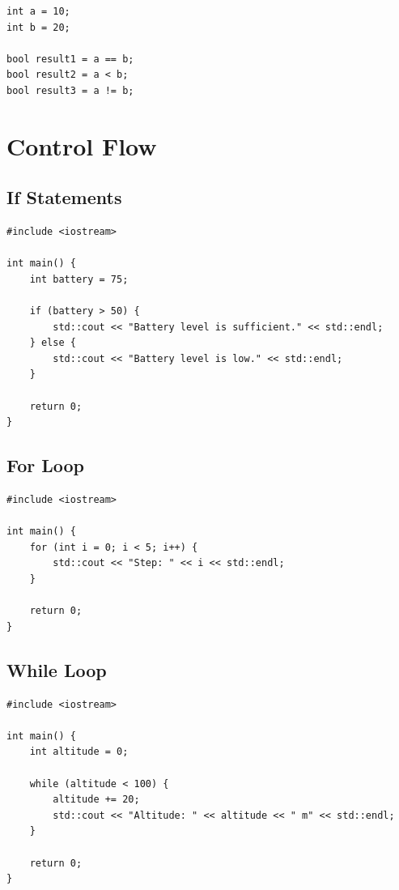 \documentclass[10pt]{report}
\begin{document}
\begin{lstlisting}[caption={Comparison Operators}]
int a = 10;
int b = 20;

bool result1 = a == b;
bool result2 = a < b;
bool result3 = a != b;
\end{lstlisting}

\section{Control Flow}

\subsection{If Statements}

\begin{lstlisting}[caption={If Statement}]
#include <iostream>

int main() {
    int battery = 75;

    if (battery > 50) {
        std::cout << "Battery level is sufficient." << std::endl;
    } else {
        std::cout << "Battery level is low." << std::endl;
    }

    return 0;
}
\end{lstlisting}

\subsection{For Loop}

\begin{lstlisting}[caption={For Loop}]
#include <iostream>

int main() {
    for (int i = 0; i < 5; i++) {
        std::cout << "Step: " << i << std::endl;
    }

    return 0;
}
\end{lstlisting}

\subsection{While Loop}

\begin{lstlisting}[caption={While Loop}]
#include <iostream>

int main() {
    int altitude = 0;

    while (altitude < 100) {
        altitude += 20;
        std::cout << "Altitude: " << altitude << " m" << std::endl;
    }

    return 0;
}
\end{lstlisting}
\end{document}
